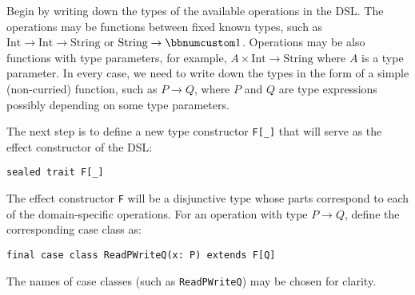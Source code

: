 Begin by writing down the types of the available operations in the
DSL. The operations may be functions between fixed known types, such
as $\text{Int}\rightarrow\text{Int}\rightarrow\text{String}$ or $\text{String}\rightarrow\bbnum 1$.
Operations may be also functions with type parameters, for example,
$A\times\text{Int}\rightarrow\text{String}$ where $A$ is a type
parameter. In every case, we need to write down the types in the form
of a simple (non-curried) function, such as $P\rightarrow Q$, where
$P$ and $Q$ are type expressions possibly depending on some type
parameters.

The next step is to define a new type constructor \lstinline!F[_]!
that will serve as the effect constructor
of the DSL:
\begin{lstlisting}
sealed trait F[_]
\end{lstlisting}
 The effect constructor \lstinline!F!
will be a disjunctive type whose parts correspond to each of the domain-specific
operations. For an operation with type $P\rightarrow Q$, define the
corresponding case class as:
\begin{lstlisting}
final case class ReadPWriteQ(x: P) extends F[Q]
\end{lstlisting}
The names of case classes (such as \lstinline!ReadPWriteQ!)
may be chosen for clarity.


